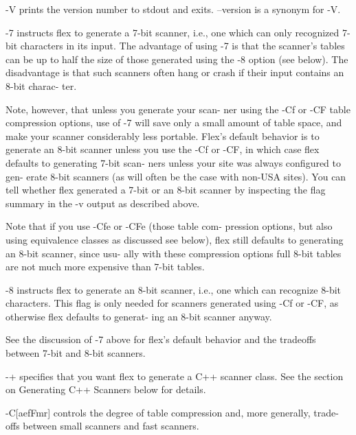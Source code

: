 \documentclass[12pt,spanish,twocolumn,lettersize]{article}
\begin{document}
{       -V     prints  the  version  number  to	stdout and exits.
	      --version is a synonym for -V.

       -7     instructs flex to generate a 7-bit  scanner,  i.e.,
	      one  which  can only recognized 7-bit characters in
	      its input.  The advantage of using -7 is	that  the
	      scanner's	 tables	 can  be  up  to half the size of
	      those generated using the -8  option  (see  below).
	      The  disadvantage	 is that such scanners often hang
	      or crash if their input contains an  8-bit  charac-
	      ter.

	      Note,  however, that unless you generate your scan-
	      ner using the -Cf or -CF table compression options,
	      use  of  -7  will save only a small amount of table
	      space, and  make	your  scanner  considerably  less
	      portable.	  Flex's  default behavior is to generate
	      an 8-bit scanner unless you use the -Cf or -CF,  in
	      which  case flex defaults to generating 7-bit scan-
	      ners unless your site was always configured to gen-
	      erate  8-bit  scanners  (as  will often be the case
	      with non-USA sites).  You	 can  tell  whether  flex
	      generated a 7-bit or an 8-bit scanner by inspecting
	      the flag summary in  the	-v  output  as	described
	      above.

	      Note that if you use -Cfe or -CFe (those table com-
	      pression	options,  but  also   using   equivalence
	      classes	as   discussed	see  below),  flex  still
	      defaults to generating an 8-bit scanner, since usu-
	      ally  with  these	 compression  options  full 8-bit
	      tables are  not  much  more  expensive  than  7-bit
	      tables.

       -8     instructs	 flex to generate an 8-bit scanner, i.e.,
	      one which can  recognize	8-bit  characters.   This
	      flag  is	only  needed for scanners generated using
	      -Cf or -CF, as otherwise flex defaults to	 generat-
	      ing an 8-bit scanner anyway.

	      See  the	discussion of -7 above for flex's default
	      behavior and the tradeoffs between 7-bit and  8-bit
	      scanners.

       -+     specifies	 that  you  want  flex	to generate a C++
	      scanner class.  See the section on  Generating  C++
	      Scanners below for details.

       -C[aefFmr]
	      controls	the degree of table compression and, more
	      generally, trade-offs between  small  scanners  and
	      fast scanners.

}
\end{document}
